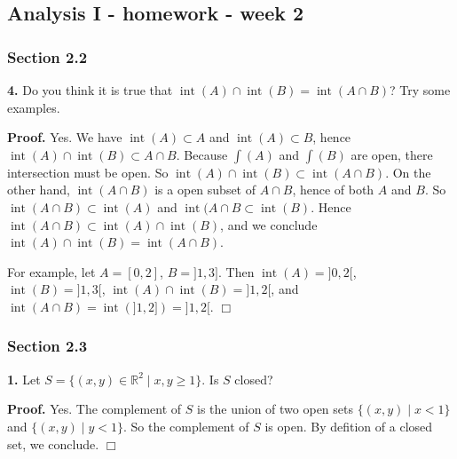\documentclass{article}
\begin{document}
    
    
    
    
    

    
    \subsection*{Analysis I - homework - week
2}\label{analysis-i---homework---week-2}

    \subsubsection*{Section 2.2}\label{section-2.2}

    \textbf{4.} Do you think it is true that
$\operatorname{int}(A)\cap \operatorname{int}(B) = \operatorname{int}(A\cap B)$?
Try some examples.

\textbf{Proof.} Yes. We have $\operatorname{int}(A) \subset A$ and
$\operatorname{int}(A) \subset B$, hence
$\operatorname{int}(A)\cap \operatorname{int}(B) \subset A\cap B$.
Because $\int(A)$ and $\int(B)$ are open, there intersection must be
open. So
$\operatorname{int}(A)\cap \operatorname{int}(B) \subset \operatorname{int}(A\cap B)$.
On the other hand, $\operatorname{int}(A\cap B)$ is a open subset of
$A\cap B$, hence of both $A$ and $B$. So
$\operatorname{int}(A\cap B) \subset \operatorname{int}(A)$ and
$\operatorname{int}(A \cap B \subset \operatorname{int}(B)$. Hence
$\operatorname{int}(A\cap B) \subset \operatorname{int}(A)\cap \operatorname{int}(B)$,
and we conclude
$\operatorname{int}(A)\cap \operatorname{int}(B) = \operatorname{int}(A\cap B)$.

For example, let $A = [0, 2]$, $B = ]1, 3]$. Then
$\operatorname{int}(A) = ]0,2[$, $\operatorname{int}(B)= ]1,3[$,
$\operatorname{int}(A) \cap \operatorname{int}(B) = ]1,2[$, and
$\operatorname{int}(A\cap B) = \operatorname{int}(]1,2]) = ]1,2[$.
$\Box$

    \subsubsection*{Section 2.3}\label{section-2.3}

    \textbf{1.} Let $S = \{(x,y)\in \mathbb{R}^2 \mid x,y \ge 1\}$. Is $S$
closed?

\textbf{Proof.} Yes. The complement of $S$ is the union of two open sets
$\{(x,y)\mid x < 1\}$ and $\{(x,y)\mid y < 1\}$. So the complement of
$S$ is open. By defition of a closed set, we conclude. $\Box$
\end{document}
